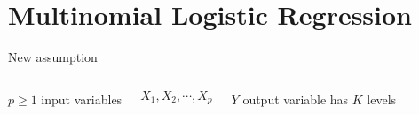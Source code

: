 \documentclass[aspectratio=169,dvipsnames]{beamer}
\newcommand{\InstructorList}[1]{
\begin{itemize}
	\color{orange}
	#1
\end{itemize}
}
\renewcommand{\InstructorList}[1]{}
\begin{document}
	
	
	
	
	
	
	
	
	
	
	
	
	
	

\section{Multinomial Logistic Regression}
\begin{frame}[c]{New assumption}
\begin{columns}
\centering
	$p\geq 1$ input variables 

	$$ 
	X_1,X_2,\cdots, X_p
	$$

\centering
$Y$ output variable has $K$ levels 
\end{columns}
\end{frame}
\end{document}
